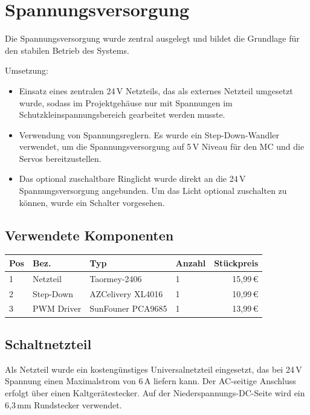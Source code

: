 \documentclass[11pt, a4paper]{scrreprt}
\begin{document}
\section{Spannungsversorgung}

Die Spannungsversorgung wurde zentral ausgelegt und bildet die Grundlage für den stabilen
Betrieb des Systems.

Umsetzung:

\begin{itemize}
  \item Einsatz eines zentralen 24\,V Netzteils, das als externes Netzteil umgesetzt wurde,
        sodass im Projektgehäuse nur mit Spannungen im Schutzkleinspannungsbereich gearbeitet
        werden musste.
  \item Verwendung von Spannungsreglern. Es wurde ein Step-Down-Wandler verwendet, um die
        Spannungsversorgung auf 5\,V Niveau für den MC und die Servos bereitzustellen.
  \item Das optional zuschaltbare Ringlicht wurde direkt an die 24\,V Spannungsversorgung
        angebunden. Um das Licht optional zuschalten zu können, wurde ein Schalter vorgesehen.
\end{itemize}

\subsection{Verwendete Komponenten}

\begin{center}
\begin{tabular}{llllr}
  \toprule
  Pos & Bez. & Typ & Anzahl & Stückpreis \\
  \midrule
  1 & Netzteil    & Taormey-2406        & 1 & 15{,}99\,€ \\
  2 & Step-Down   & AZCelivery XL4016   & 1 & 10{,}99\,€ \\
  3 & PWM Driver  & SunFouner PCA9685   & 1 & 13{,}99\,€ \\
  \bottomrule
\end{tabular}
\end{center}

\subsection{Schaltnetzteil}

Als Netzteil wurde ein kostengünstiges Universalnetzteil eingesetzt, das bei 24\,V Spannung
einen Maximalstrom von 6\,A liefern kann. Der AC-seitige Anschluss erfolgt über einen
Kaltgerätestecker. Auf der Niederspannungs-DC-Seite wird ein 6{,}3\,mm Rundstecker verwendet.
\end{document}
